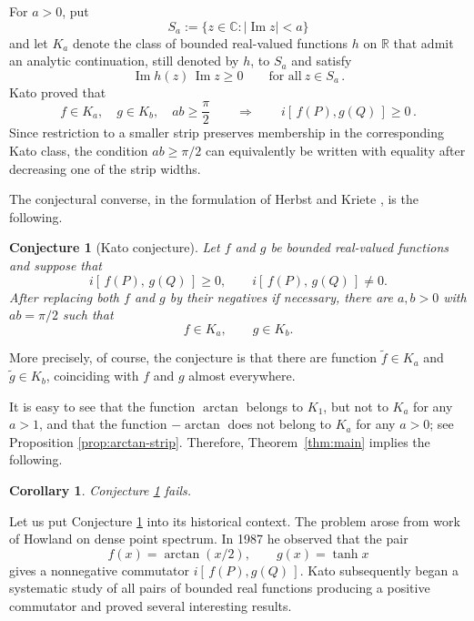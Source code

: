 \documentclass[10pt,a4paper]{amsart}
\newtheorem{corollary}[theorem]{Corollary}
\newtheorem{conjecture}[theorem]{Conjecture}
\newcommand{\R}{\mathbb{R}}
\newcommand{\C}{\mathbb{C}}
\newcommand{\abs}[1]{\left\lvert #1\right\rvert}
\begin{document}
For $a>0$, put
\[
S_a:=\{z\in\C:\abs{\operatorname{Im}z}<a\}
\]
and let $K_a$ denote the class of bounded real-valued functions $h$ on $\R$ that admit an analytic continuation, still denoted by $h$, to $S_a$ and satisfy
\begin{equation}\label{eq:Kato-sign}
\operatorname{Im}h(z)\,\operatorname{Im}z\geq 0
\qquad \text{for all}\ z\in S_a \,.
\end{equation}
Kato \cite{Kato} proved that
\begin{equation}\label{eq:Kato-sufficient}
f\in K_a,\quad g\in K_b,\quad ab\geq \frac{\pi}{2}
\qquad\Longrightarrow\qquad
i[\,f(P),g(Q)\,]\geq 0 \,.
\end{equation}
Since restriction to a smaller strip preserves membership in the corresponding Kato class, the condition $ab\geq\pi/2$ can equivalently be written with equality after decreasing one of the strip widths.

The conjectural converse, in the formulation of Herbst and Kriete \cite{HerbstKriete}, is the following.

\begin{conjecture}[Kato conjecture]\label{conj:Kato}
Let $f$ and $g$ be bounded real-valued functions and suppose that
\[
i[\,f(P),\,g(Q)\,]\geq 0,
\qquad
i[\,f(P),\, g(Q)\,]\neq 0.
\]
After replacing both $f$ and $g$ by their negatives if necessary, there are $a,b>0$ with $ab=\pi/2$ such that
\[
f\in K_a,
\qquad
g\in K_b.
\]
\end{conjecture}

More precisely, of course, the conjecture is that there are function $\tilde f\in K_a$ and $\tilde g\in K_b$, coinciding with $f$ and $g$ almost everywhere.

It is easy to see that the function $\arctan$ belongs to $K_1$, but not to $K_a$ for any $a>1$, and that the function $-\arctan$ does not belong to $K_a$ for any $a>0$; see Proposition \ref{prop:arctan-strip}. Therefore, Theorem~\ref{thm:main} implies the following.

\begin{corollary}
Conjecture \ref{conj:Kato} fails.
\end{corollary}

Let us put Conjecture \ref{conj:Kato} into its historical context. The problem arose from work of Howland \cite{Howland} on dense point spectrum.  In 1987 he observed that the pair
\[
f(x)=\arctan(x/2),
\qquad
g(x)=\tanh x
\]
gives a nonnegative commutator $i[\,f(P),g(Q)\,]$.  Kato subsequently began a systematic study of all pairs of bounded real functions producing a positive commutator \cite{Kato} and proved several interesting results.
\end{document}
